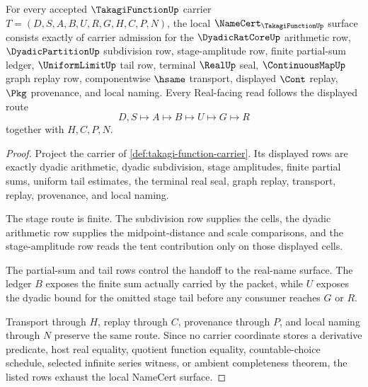 \begin{theorem}
\label{thm:takagi-function-namecert-obligations}
For every accepted $\TakagiFunctionUp$ carrier $T=(D,S,A,B,U,R,G,H,C,P,N)$, the local $\NameCert_{\TakagiFunctionUp}$ surface consists exactly of carrier admission for the $\DyadicRatCoreUp$ arithmetic row, $\DyadicPartitionUp$ subdivision row, stage-amplitude row, finite partial-sum ledger, $\UniformLimitUp$ tail row, terminal $\RealUp$ seal, $\ContinuousMapUp$ graph replay row, componentwise $\hsame$ transport, displayed $\Cont$ replay, $\Pkg$ provenance, and local naming. Every Real-facing read follows the displayed route
$$
D,S \longmapsto A \longmapsto B \longmapsto U \longmapsto G \longmapsto R
$$
together with $H,C,P,N$.
\end{theorem}
\begin{proof}
Project the carrier of \autoref{def:takagi-function-carrier}. Its displayed rows are exactly dyadic arithmetic, dyadic subdivision, stage amplitudes, finite partial sums, uniform tail estimates, the terminal real seal, graph replay, transport, replay, provenance, and local naming.

The stage route is finite. The subdivision row supplies the cells, the dyadic arithmetic row supplies the midpoint-distance and scale comparisons, and the stage-amplitude row reads the tent contribution only on those displayed cells.

The partial-sum and tail rows control the handoff to the real-name surface. The ledger $B$ exposes the finite sum actually carried by the packet, while $U$ exposes the dyadic bound for the omitted stage tail before any consumer reaches $G$ or $R$.

Transport through $H$, replay through $C$, provenance through $P$, and local naming through $N$ preserve the same route. Since no carrier coordinate stores a derivative predicate, host real equality, quotient function equality, countable-choice schedule, selected infinite series witness, or ambient completeness theorem, the listed rows exhaust the local NameCert surface.
\end{proof}

